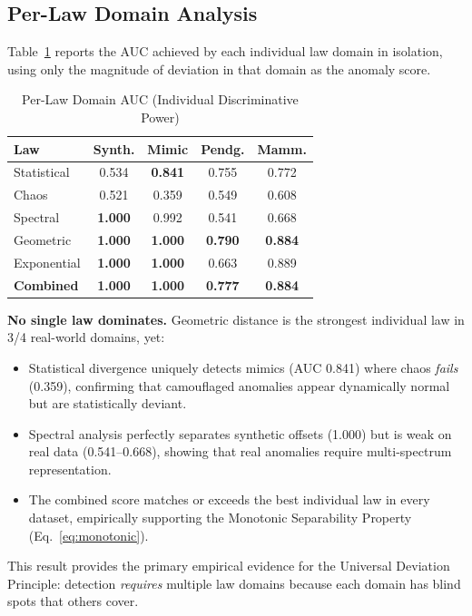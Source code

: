 \documentclass[journal]{IEEEtran}
\begin{document}
\subsection{Per-Law Domain Analysis}
\label{ssec:perlaw}

Table~\ref{tab:perlaw} reports the AUC achieved by each individual law domain in isolation, using only the magnitude of deviation in that domain as the anomaly score.

\begin{table}[h]
\centering
\caption{Per-Law Domain AUC (Individual Discriminative Power)}
\label{tab:perlaw}
\begin{tabular}{@{}lcccc@{}}
\toprule
\textbf{Law} & \textbf{Synth.} & \textbf{Mimic} & \textbf{Pendg.} & \textbf{Mamm.} \\
\midrule
Statistical & 0.534 & \textbf{0.841} & 0.755 & 0.772 \\
Chaos & 0.521 & 0.359 & 0.549 & 0.608 \\
Spectral & \textbf{1.000} & 0.992 & 0.541 & 0.668 \\
Geometric & \textbf{1.000} & \textbf{1.000} & \textbf{0.790} & \textbf{0.884} \\
Exponential & \textbf{1.000} & \textbf{1.000} & 0.663 & 0.889 \\
\midrule
\textbf{Combined} & \textbf{1.000} & \textbf{1.000} & \textbf{0.777} & \textbf{0.884} \\
\bottomrule
\end{tabular}
\end{table}

\textbf{No single law dominates.} Geometric distance is the strongest individual law in 3/4 real-world domains, yet:
\begin{itemize}
  \item Statistical divergence uniquely detects mimics (AUC 0.841) where chaos \textit{fails} (0.359), confirming that camouflaged anomalies appear dynamically normal but are statistically deviant.
  \item Spectral analysis perfectly separates synthetic offsets (1.000) but is weak on real data (0.541--0.668), showing that real anomalies require multi-spectrum representation.
  \item The combined score matches or exceeds the best individual law in every dataset, empirically supporting the Monotonic Separability Property (Eq.~\eqref{eq:monotonic}).
\end{itemize}

This result provides the primary empirical evidence for the Universal Deviation Principle: detection \textit{requires} multiple law domains because each domain has blind spots that others cover.
\end{document}
